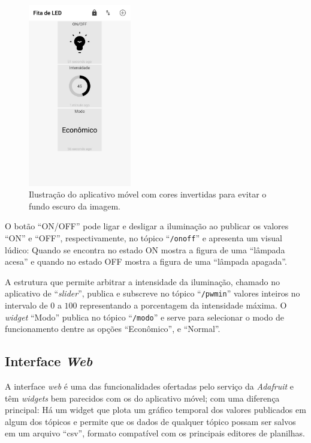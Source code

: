 \begin{figure}[ht]
    \begin{center}
    \includegraphics[width=0.4\textwidth]{figuras/appdash.png}
    \end{center}
    \caption[Ilustração do aplicativo móvel.]{Ilustração do aplicativo móvel com cores invertidas para evitar o fundo escuro da imagem.}
    \label{appdash}
\end{figure}

O botão ``ON/OFF'' pode ligar e desligar a iluminação ao publicar os valores ``ON'' e ``OFF'', respectivamente, no tópico ``\texttt{/onoff}'' e apresenta um visual lúdico: Quando se encontra no estado ON mostra a figura de uma ``lâmpada acesa'' e quando no estado OFF mostra a figura de uma ``lâmpada apagada''. 

A estrutura que permite arbitrar a intensidade da iluminação, chamado no aplicativo de ``\textit{slider}'', publica e subscreve no tópico ``\texttt{/pwmin}'' valores inteiros no intervalo de $0$ a $100$ representando a porcentagem da intensidade máxima. O \textit{widget} ``Modo'' publica no tópico ``\texttt{/modo}'' e serve para selecionar o modo de funcionamento dentre as opções ``Econômico'', e ``Normal''. 

\subsection{Interface \textit{Web}}

A interface \textit{web} é uma das funcionalidades ofertadas pelo serviço da \textit{Adafruit} e têm \textit{widgets} bem parecidos com os do aplicativo móvel; com uma diferença principal: Há um widget que plota um gráfico temporal dos valores publicados em algum dos tópicos e permite que os dados de qualquer tópico possam ser salvos em um arquivo ``csv'', formato compatível com os principais editores de planilhas.


